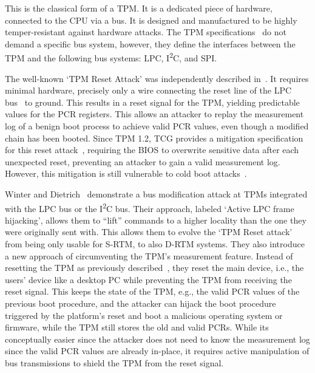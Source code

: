 This is the classical form of a TPM\@. It is a dedicated piece of hardware, connected to the CPU via a bus. It is designed and manufactured to be highly temper-resistant against hardware attacks.
The TPM specifications~\cite{tpm, tcgPcClient} do not demand a specific bus system, however, they define the interfaces between the TPM and the following bus systems: LPC, I\textsuperscript{2}C, and SPI\@.

The well-known `TPM Reset Attack' was independently described in~\cite{kauerBernhard,sparks2007}. It requires minimal hardware, precisely only a wire connecting the reset line of the LPC bus~\cite{lpc} to ground. This results in a reset signal for the TPM, yielding predictable values for the \ac{PCR} registers. This allows an attacker to replay the measurement log of a benign boot process to achieve valid \ac{PCR} values, even though a modified chain has been booted.
Since TPM 1.2, TCG provides a mitigation specification for this reset attack~\cite{tcgResetFix}, requiring the BIOS to overwrite sensitive data after each unexpected reset, preventing an attacker to gain a valid measurement log.
However, this mitigation is still vulnerable to cold boot attacks~\cite{Halderman2009, Winter2013}.

Winter and Dietrich~\cite{Winter2013} demonstrate a bus modification attack at TPMs integrated with the LPC bus or the I\textsuperscript{2}C bus.
Their approach, labeled `Active LPC frame hijacking', allows them to ``lift'' commands to a higher locality than the one they were originally sent with. This allows them to evolve the `TPM Reset attack' from being only usable for S-RTM, to also D-RTM systems.
They also introduce a new approach of circumventing the TPM's measurement feature. Instead of resetting the TPM as previously described~\cite{kauerBernhard,sparks2007}, they reset the main device, i.e., the users' device like a desktop PC while preventing the TPM from receiving the reset signal. This keeps the state of the TPM, e.g., the valid \ac{PCR} values of the previous boot procedure, and the attacker can hijack the boot procedure triggered by the platform's reset and boot a malicious operating system or firmware, while the TPM still stores the old and valid PCRs. While its conceptually easier since the attacker does not need to know the measurement log since the valid \ac{PCR} values are already in-place, it requires active manipulation of bus transmissions to shield the TPM from the reset signal.

